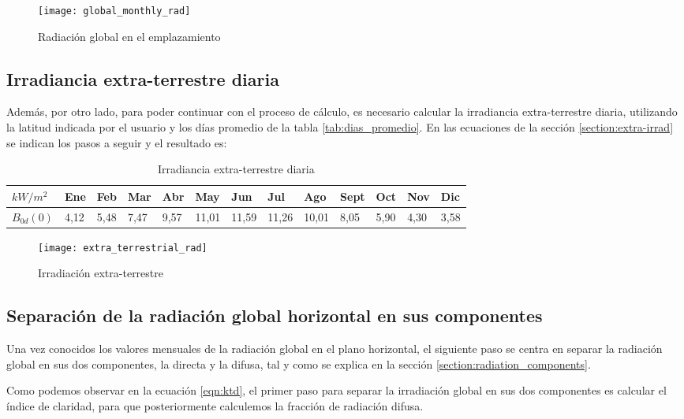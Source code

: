 \begin{figure}[ht]
\texttt{[image: global\_monthly\_rad]}
\centering
\caption{Radiación global en el emplazamiento}
\label{fig:mean_values_monthly}
\end{figure}

\subsection{Irradiancia extra-terrestre diaria}

Además, por otro lado, para poder continuar con el proceso de cálculo, es necesario calcular la irradiancia extra-terrestre diaria, utilizando la latitud indicada por el usuario y los días promedio de la tabla \ref{tab:dias_promedio}.
En las ecuaciones de la sección \ref{section:extra-irrad} se indican los pasos a seguir y el resultado es:
\begin{table}[ht]
\centering
\begin{tabular}{|l|l|l|l|l|l|l|l|l|l|l|l|l|}
\hline
$kW/m^2$   & Ene & Feb & Mar & Abr & May & Jun & Jul & Ago & Sept & Oct & Nov & Dic \\ \hline
$B_{0d}(0)$ & 4,12 & 5,48 & 7,47 & 9,57 & 11,01 & 11,59 & 11,26 & 10,01 & 8,05 & 5,90  & 4,30 & 3,58 \\ \hline
\end{tabular}
\label{tab:extra_irrad_values}
\caption{Irradiancia extra-terrestre diaria}
\end{table}

\begin{figure}[ht]
\texttt{[image: extra\_terrestrial\_rad]}
\centering
\caption{Irradiación extra-terrestre}
\label{fig:mean_values_monthly}
\end{figure}

\subsection{Separación de la radiación global horizontal en sus componentes}

Una vez conocidos los valores mensuales de la radiación global en el plano horizontal, el siguiente paso se centra en separar la radiación global en sus dos componentes, la directa y la difusa, tal y como se explica en la sección \ref{section:radiation_components}.

Como podemos observar en la ecuación \ref{eqn:ktd}, el primer paso para separar la irradiación global en sus dos componentes es calcular el índice de claridad, para que posteriormente calculemos la fracción de radiación difusa. 

